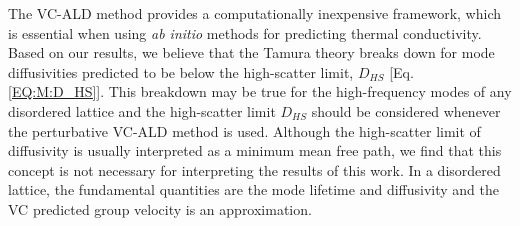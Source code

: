 The VC-ALD method provides a computationally inexpensive framework, 
which is 
essential when using \emph{ab initio} 
methods for predicting thermal conductivity.
\cite{ward_intrinsic_2010,lindsay_thermal_2012,garg_role_2011,
shiga_microscopic_2012,tian_phonon_2012,shiomi_thermal_2011,
esfarjani_heat_2011,li_thermal_2012,luckyanova_coherent_2012} 
Based on our results, 
we believe that the Tamura theory breaks down for mode  
diffusivities predicted to be below the high-scatter limit, $D_{HS}$ 
[Eq. \eqref{EQ:M:D_HS}]. 
This breakdown may be true for the high-frequency modes of any 
disordered lattice\cite{sheng_heat_1991} 
and the high-scatter limit $D_{HS}$ should be 
considered whenever the perturbative VC-ALD method is used.
Although the high-scatter limit of 
diffusivity is usually interpreted as a minimum mean free path,
\cite{kittel_interpretation_1949,graebner_phonon_1986,
cahill_lattice_1988,sheng_heat_1991} 
we find that this concept is not necessary for interpreting the results 
of this work. In a disordered lattice, the fundamental quantities are 
the mode lifetime and diffusivity\cite{sheng_heat_1991,
allen_thermal_1993,allen_diffusons_1999,taraskin_determination_1999,
xu_energy_2009,vitelli_heat_2010,beltukov_ioffe-regel_2013} and the 
VC predicted group velocity is an approximation.



